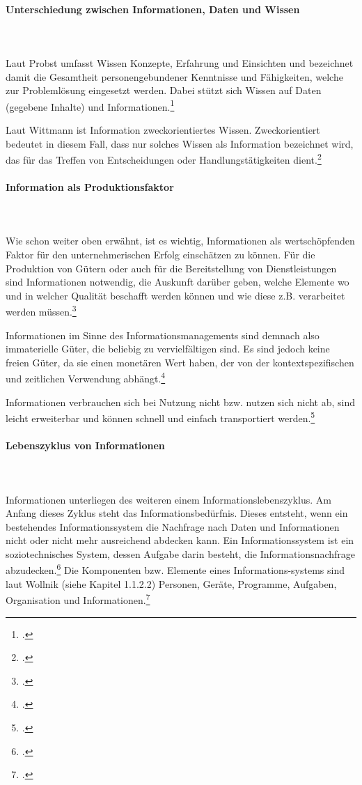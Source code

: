 \paragraph*{Unterschiedung zwischen Informationen, Daten und Wissen}\mbox{}\\\\
Laut Probst umfasst Wissen Konzepte, Erfahrung und Einsichten und bezeichnet damit die Gesamtheit personengebundener Kenntnisse und Fähigkeiten, welche zur Problemlösung eingesetzt werden. Dabei stützt sich Wissen auf Daten (gegebene Inhalte) und Informationen.\footcite[Vgl.][]{probst_wissen_2006}

Laut Wittmann ist Information zweckorientiertes Wissen. Zweckorientiert bedeutet in diesem Fall, dass nur solches Wissen als Information bezeichnet wird, das für das Treffen von Entscheidungen oder Handlungstätigkeiten dient.\footcite[Vgl.][14]{wittmann_unternehmung_1959}

\paragraph*{Information als Produktionsfaktor}\mbox{}\\\\
Wie schon weiter oben erwähnt, ist es wichtig, Informationen als wertschöpfenden Faktor für den unternehmerischen Erfolg einschätzen zu können. Für die Produktion von Gütern oder auch für die Bereitstellung von Dienstleistungen sind Informationen notwendig, die Auskunft darüber geben, welche Elemente wo und in welcher Qualität beschafft werden können und wie diese z.B. verarbeitet werden müssen.\footcite[Vgl. u.a.][]{bode_informationsbegriff_1997}

Informationen im Sinne des Informationsmanagements sind demnach also immaterielle Güter, die beliebig zu vervielfältigen sind. Es sind jedoch keine freien Güter, da sie einen monetären Wert haben, der von der kontextspezifischen und zeitlichen Verwendung abhängt.\footcite[Vgl.][21]{krcmar_informationsmanagement_2015}

Informationen verbrauchen sich bei Nutzung nicht bzw. nutzen sich nicht ab, sind leicht erweiterbar und können schnell und einfach transportiert werden.\footcite[Vgl. u.a.][]{teubner_information_2005}

\paragraph*{Lebenszyklus von Informationen}\mbox{}\\\\
Informationen unterliegen des weiteren einem Informationslebenszyklus. Am Anfang dieses Zyklus steht das Informationsbedürfnis. Dieses entsteht, wenn ein bestehendes Informationssystem die Nachfrage nach Daten und Informationen nicht oder nicht mehr ausreichend abdecken kann. Ein Informationssystem ist ein soziotechnisches System, dessen Aufgabe darin besteht, die Informationsnachfrage abzudecken.\footcite{GluchowskiGabrielDittmar_ManagementSupportSysteme_2008} Die Komponenten bzw. Elemente eines Informations-systems sind laut Wollnik (siehe Kapitel 1.1.2.2) Personen, Geräte, Programme, Aufgaben, Organisation und Informationen.\footcite[Vgl.][]{wollnik_referenzmodell_1988}

